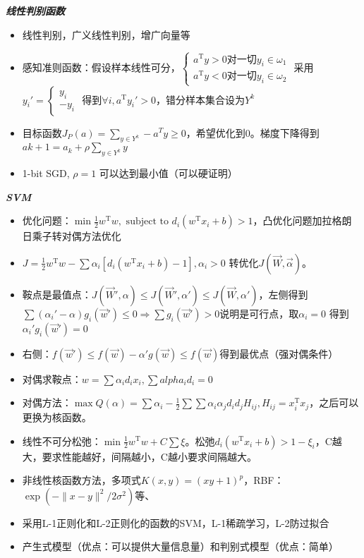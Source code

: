 \documentclass[UTF8,a4paper,landscape,compress]{paper}
\renewcommand{\section}[1]{{\normalsize\textbf{\emph{#1}}}\\ }
\newcommand{\List}[1]{\begin{itemize}[fullwidth,itemindent=0em] #1 \end{itemize}}
\begin{document}
\begin{multicols}{4}
\section{线性判别函数}
\List{
    \item {线性判别，广义线性判别，增广向量等}
    \item {感知准则函数：假设样本线性可分，$\begin{cases}
        a^{\mathrm T}y > 0 \text{对一切}y_i \in \omega_1\\
        a^{\mathrm T}y < 0 \text{对一切}y_i \in \omega_2
    \end{cases}$
    采用$y_i' = \begin{cases}
        y_i\\
        -y_i
    \end{cases}$
    得到$\forall i, a^{\mathrm T}y_i' > 0$，错分样本集合设为$Y^k$}

    \item {目标函数$J_P(a)  = \sum_{y\in Y^k}-a^Ty \ge 0$，希望优化到0。梯度下降得到$a{k+1} = a_k + \rho\sum_{y\in Y^k}y$}
    \item {1-bit SGD, $\rho = 1$ 可以达到最小值（可以硬证明）}
}
\section{SVM}
\List{
    \item {优化问题：$\min \frac12 w^{\mathrm T}w, \text{  subject to  } d_i(w^{\mathrm T}x_i + b) > 1$，凸优化问题加拉格朗日乘子转对偶方法优化}
    \item {$J = \frac12 w^{\mathrm T}w - \sum \alpha_i[d_i(w^{\mathrm T}x_i + b) - 1],\alpha_i > 0$ 转优化$J(\vec W, \vec \alpha)$。}
    \item {鞍点是最值点：$J(\vec W',\alpha) \le J(\vec W',\alpha') \le J(\vec W,\alpha')$，左侧得到$\sum (\alpha_i' - \alpha)g_i(\vec w') \le 0 \Rightarrow \sum g_i(\vec w') >0$说明是可行点，取$\alpha_i = 0$ 得到$\alpha_i'g_i(\vec w') = 0$}
    \item {右侧：$f(\vec w') \le f(\vec w) - \alpha'g(\vec w) \le f(\vec w)$得到最优点（强对偶条件）}
    \item {对偶求鞍点：$w = \sum \alpha_id_ix_i,\sum alpha_id_i = 0$}
    \item {对偶方法：$\max Q(\alpha)= \sum \alpha_i - \frac12\sum\sum\alpha_i\alpha_jd_id_jH_{ij},H_{ij} = x_i^{\mathrm T}x_j$，之后可以更换为核函数。}
    \item {线性不可分松弛：$\min \frac12 w^{\mathrm T}w + C\sum\xi$。松弛$d_i(w^{\mathrm T}x_i + b) > 1 - \xi_i$，C越大，要求性能越好，间隔越小，C越小要求间隔越大。}
    \item {非线性核函数方法，多项式$K(x,y) = (xy+1)^p$，RBF：$\exp(-\|x-y\|^2 / 2\sigma^2)$等}、
    \item {采用L-1正则化和L-2正则化的函数的SVM，L-1稀疏学习，L-2防过拟合}
    \item {产生式模型（优点：可以提供大量信息量）和判别式模型（优点：简单）}
}

\end{multicols}
\end{document}
